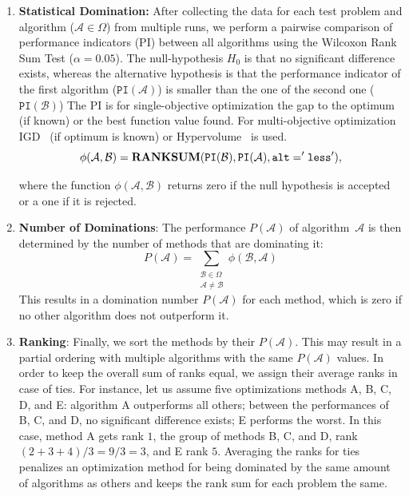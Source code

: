 \documentclass[journal]{IEEEtran}
\begin{document}
\begin{enumerate}[label=\textbf{\roman*.}, itemsep=0pt]

\item \textbf{Statistical Domination:}  After collecting the data for each test problem and algorithm ($\mathcal{A} \in \Omega$) from multiple runs, we perform a pairwise comparison of performance indicators (PI) between all algorithms using the Wilcoxon Rank Sum Test ($\alpha=0.05$). The null-hypothesis $H_0$ is that no significant difference exists, whereas the alternative hypothesis is that the performance indicator of the first algorithm ($\texttt{PI}(\mathcal{A})$) is smaller than the one of the second one ($\texttt{PI}(\mathcal{B})$)
The PI is for single-objective optimization the gap to the optimum (if known) or the best function value found. For multi-objective optimization IGD~\cite{2004-coello-igd} (if optimum is known) or Hypervolume~\cite{1998-zitzler-hv} is used.
\begin{equation}
    \phi(\mathcal{A}, \mathcal{B}) = \tt{\textbf{RANKSUM}}(\tt{PI}(\mathcal{B}), \tt{PI}(\mathcal{A}),  \tt{alt='less'}),
\end{equation}

where the function $\phi(\mathcal{A}, \mathcal{B})$ returns zero if the null hypothesis is accepted or a one if it is rejected. 

\vspace{1mm}
\item \textbf{Number of Dominations}: The performance $P(\mathcal{A})$ of algorithm~$\mathcal{A}$ is then determined by the number of methods that are dominating it:
\begin{equation}
    P(\mathcal{A}) = \sum_{\substack{\mathcal{B} \in \Omega\\ \mathcal{A} \neq \mathcal{B}}} \phi(\mathcal{B}, \mathcal{A})
\end{equation}
This results in a domination number $P(\mathcal{A})$ for each method, which is zero if no other algorithm does not outperform it.

\vspace{1mm}
\item \textbf{Ranking}: Finally, we sort the methods by their $P(\mathcal{A})$. This may result in a partial ordering with multiple algorithms with the same $P(\mathcal{A})$ values. In order to keep the overall sum of ranks equal, we assign their average ranks in case of ties.
For instance, let us assume five optimizations methods A, B, C, D, and E:  algorithm A outperforms all others; between the performances of B, C, and D, no significant difference exists; E performs the worst. In this case, method A gets rank $1$, the group of methods B, C, and D, rank $(2 + 3 + 4) / 3 = 9/3 = 3$, and E rank $5$.  Averaging the ranks for ties penalizes an optimization method for being dominated by the same amount of algorithms as others and keeps the rank sum for each problem the same.

\end{enumerate}
\end{document}
